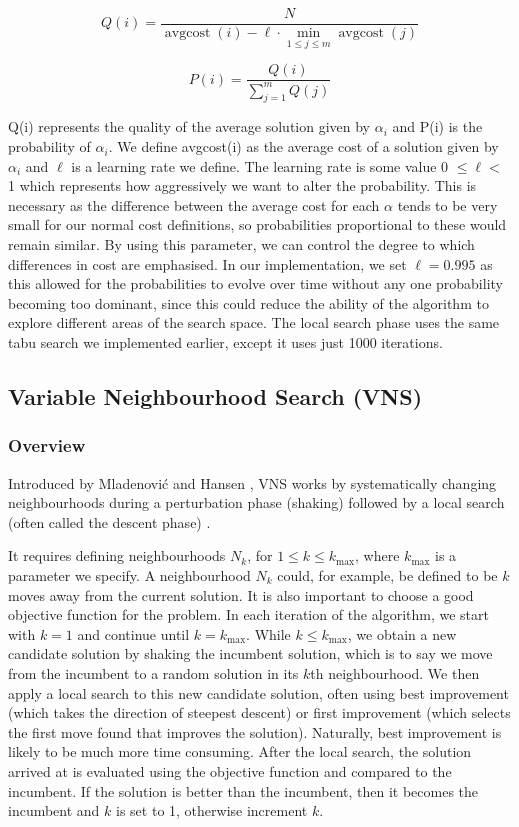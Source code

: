 \documentclass[12pt]{article}
\begin{document}
\[ 
Q(i) = \frac{N}{\operatorname{avgcost}(i) - \ell \cdot \min_{1 \le j \le m} \operatorname{avgcost}(j)} 
\] 

\[ 
P(i) = \frac{Q(i)}{\sum_{j=1}^{m} Q(j)} 
\] 

Q(i) represents the quality of the average solution given by $\alpha_i$ and P(i) is the probability of $\alpha_i$. We define avgcost(i) as the average cost of a solution given by $\alpha_i$ and $\ell$ is a learning rate we define. The learning rate is some value 0 $\le \ell <$ 1 which represents how aggressively we want to alter the probability. This is necessary as the difference between the average cost for each $\alpha$ tends to be very small for our normal cost definitions, so probabilities proportional to these would remain similar. By using this parameter, we can control the degree to which differences in cost are emphasised. In our implementation, we set $\ell = 0.995$ as this allowed for the probabilities to evolve over time without any one probability becoming too dominant, since this could reduce the ability of the algorithm to explore different areas of the search space. The local search phase uses the same tabu search we implemented earlier, except it uses just 1000 iterations.   

\subsection{Variable Neighbourhood Search (VNS)}

\subsubsection{Overview}
Introduced by Mladenović and Hansen \cite{mladenovic}, VNS works by systematically changing neighbourhoods during a perturbation phase (shaking) followed by a local search (often called the descent phase) \cite{gendreau}.  

It requires defining neighbourhoods $N_{k}$, for $1 \le k \le k_{\max}$, where $k_{\max}$ is a parameter we specify. A neighbourhood $N_{k}$ could, for example, be defined to be $k$ moves away from the current solution. It is also important to choose a good objective function for the problem. In each iteration of the algorithm, we start with $k = 1$ and continue until $k = k_{\max}$. While $k \le k_{\max}$, we obtain a new candidate solution by shaking the incumbent solution, which is to say we move from the incumbent to a random solution in its $k$th neighbourhood. We then apply a local search to this new candidate solution, often using best improvement (which takes the direction of steepest descent) or first improvement (which selects the first move found that improves the solution). Naturally, best improvement is likely to be much more time consuming. After the local search, the solution arrived at is evaluated using the objective function and compared to the incumbent. If the solution is better than the incumbent, then it becomes the incumbent and $k$ is set to 1, otherwise increment $k$.  
\end{document}

